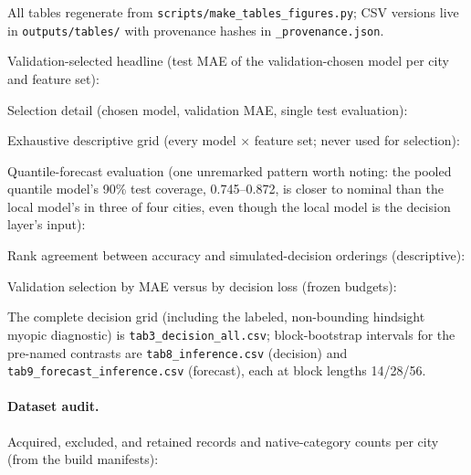 {\sloppy All tables regenerate from \texttt{scripts/\allowbreak make\_tables\_figures.py};
CSV versions live in \texttt{outputs/tables/} with provenance hashes in
\texttt{\_provenance.json}.\par}

Validation-selected headline (test MAE of the validation-chosen model per
city and feature set):

{\small}

Selection detail (chosen model, validation MAE, single test evaluation):

{\small}

Exhaustive descriptive grid (every model $\times$ feature set; never used
for selection):

{\small}

Quantile-forecast evaluation (one unremarked pattern worth noting: the
pooled quantile model's 90\% test coverage, 0.745--0.872, is closer to
nominal than the local model's in three of four cities, even though the
local model is the decision layer's input):

{\small}

Rank agreement between accuracy and simulated-decision orderings
(descriptive):

{\small}

Validation selection by MAE versus by decision loss (frozen budgets):

\begin{landscape}
\noindent\scalebox{0.65}{%
}
\end{landscape}

The complete decision grid (including the labeled, non-bounding hindsight
myopic diagnostic) is \texttt{tab3\_decision\_all.csv}; block-bootstrap
intervals for the pre-named contrasts are \texttt{tab8\_inference.csv}
(decision) and \texttt{tab9\_forecast\_inference.csv} (forecast), each at
block lengths 14/28/56.

\paragraph{Dataset audit.} Acquired, excluded, and retained records and
native-category counts per city (from the build manifests):

{\footnotesize}

